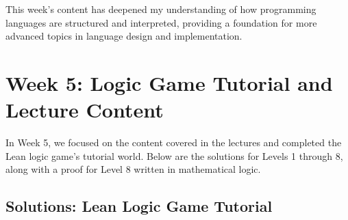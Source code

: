 \documentclass{article}
\begin{document}
This week's content has deepened my understanding of how programming languages are structured and interpreted, providing a foundation for more advanced topics in language design and implementation.

\section{Week 5: Logic Game Tutorial and Lecture Content}
\label{sec:week5}

In Week 5, we focused on the content covered in the lectures and completed the Lean logic game's tutorial world. Below are the solutions for Levels 1 through 8, along with a proof for Level 8 written in mathematical logic.

\subsection*{Solutions: Lean Logic Game Tutorial}
\hfill\break
\end{document}
